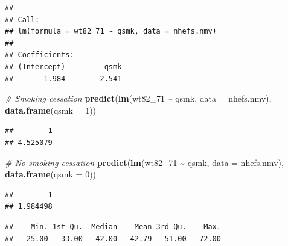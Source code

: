 \documentclass[
  10pt,
]{book}
\newenvironment{Shaded}{\begin{snugshade}}{\end{snugshade}}
\newcommand{\CommentTok}[1]{\textcolor[rgb]{0.56,0.35,0.01}{\textit{#1}}}
\newcommand{\DataTypeTok}[1]{\textcolor[rgb]{0.13,0.29,0.53}{#1}}
\newcommand{\DecValTok}[1]{\textcolor[rgb]{0.00,0.00,0.81}{#1}}
\newcommand{\KeywordTok}[1]{\textcolor[rgb]{0.13,0.29,0.53}{\textbf{#1}}}
\newcommand{\NormalTok}[1]{#1}
\newcommand{\OperatorTok}[1]{\textcolor[rgb]{0.81,0.36,0.00}{\textbf{#1}}}
\newcommand{\StringTok}[1]{\textcolor[rgb]{0.31,0.60,0.02}{#1}}
\begin{document}
\begin{verbatim}
## 
## Call:
## lm(formula = wt82_71 ~ qsmk, data = nhefs.nmv)
## 
## Coefficients:
## (Intercept)         qsmk  
##       1.984        2.541
\end{verbatim}

\begin{Shaded}
\begin{Highlighting}[]
\CommentTok{\# Smoking cessation}
\KeywordTok{predict}\NormalTok{(}\KeywordTok{lm}\NormalTok{(wt82\_}\DecValTok{71} \OperatorTok{\textasciitilde{}}\StringTok{ }\NormalTok{qsmk, }\DataTypeTok{data =}\NormalTok{ nhefs.nmv), }\KeywordTok{data.frame}\NormalTok{(}\DataTypeTok{qsmk =} \DecValTok{1}\NormalTok{))}
\end{Highlighting}
\end{Shaded}

\begin{verbatim}
##        1 
## 4.525079
\end{verbatim}

\begin{Shaded}
\begin{Highlighting}[]
\CommentTok{\# No smoking cessation}
\KeywordTok{predict}\NormalTok{(}\KeywordTok{lm}\NormalTok{(wt82\_}\DecValTok{71} \OperatorTok{\textasciitilde{}}\StringTok{ }\NormalTok{qsmk, }\DataTypeTok{data =}\NormalTok{ nhefs.nmv), }\KeywordTok{data.frame}\NormalTok{(}\DataTypeTok{qsmk =} \DecValTok{0}\NormalTok{)) }
\end{Highlighting}
\end{Shaded}

\begin{verbatim}
##        1 
## 1.984498
\end{verbatim}

\begin{Shaded}
\end{Shaded}

\begin{verbatim}
##    Min. 1st Qu.  Median    Mean 3rd Qu.    Max. 
##   25.00   33.00   42.00   42.79   51.00   72.00
\end{verbatim}

\begin{Shaded}
\end{Shaded}
\end{document}
